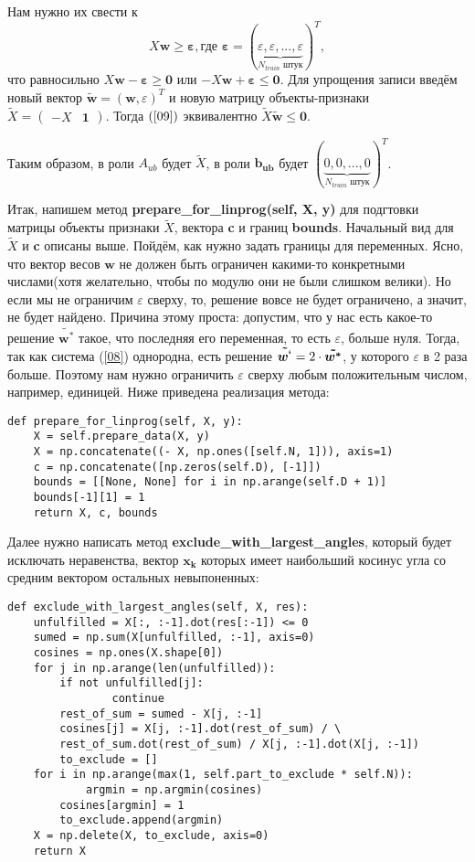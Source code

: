 \documentclass[a4paper]{article}
\newcommand{\w}{\bm{w}}
\newcommand{\xk}{\bm{x_k}}
\newcommand{\veps}{\bm{\varepsilon}}
\begin{document}
Нам нужно их свести к 
\begin{equation}\label{09}
X\w \ge \veps , \text{где } \veps = (\underbrace{\varepsilon, \varepsilon, ..., \varepsilon}_\text{$N_{train}$ штук})^T,
\end{equation}
что равносильно $X\w - \veps \ge \bm{0}$ или $-X\w + \veps \le \bm{0}$. Для упрощения записи введём новый вектор $\tilde{\w} = (\w, \varepsilon)^T$ и новую матрицу объекты-признаки
$\tilde{X} = \left(\begin{array}{c|c}
- X &  \bm{1}
\end{array}\right)$. Тогда $(\ref{09})$ эквивалентно $\tilde{X}\tilde{\w} \le \bm{0}$.

Таким образом, в роли $A_{ub}$ будет $\tilde{X}$, в роли $\bm{b_{ub}}$ будет $(\underbrace{0, 0, ..., 0}_\text{$N_{train}$ штук})^T$.

Итак, напишем метод \textbf{prepare\_for\_linprog(self, X, y)} для подгтовки матрицы объекты признаки $\tilde{X}$, вектора \textbf{c} и границ \textbf{bounds}. Начальный вид для $\tilde{X}$ и \textbf{c} описаны выше. Пойдём, как нужно задать границы для переменных. Ясно, что вектор весов $\w$ не должен быть ограничен какими-то конкретными числами(хотя желательно, чтобы по модулю они не были слишком велики). Но если мы не ограничим $\varepsilon$ сверху, то, решение вовсе не будет ограничено, а значит, не будет найдено. Причина этому проста: допустим, что у нас есть какое-то решение $\bm{\tilde{w^*}}$ такое, что последняя его переменная, то есть $\varepsilon$, больше нуля. Тогда, так как система (\ref{08}) однородна, есть решение $\bm{\tilde{w^`}} = 2 \cdot \bm{\tilde{w^*}}$, у которого $\varepsilon$ в 2 раза больше. Поэтому нам нужно ограничить $\varepsilon$ сверху любым положительным числом, например, единицей. Ниже приведена реализация метода:
\begin{lstlisting}
def prepare_for_linprog(self, X, y):
	X = self.prepare_data(X, y)
	X = np.concatenate((- X, np.ones([self.N, 1])), axis=1)
	c = np.concatenate([np.zeros(self.D), [-1]])
	bounds = [[None, None] for i in np.arange(self.D + 1)]
	bounds[-1][1] = 1
	return X, c, bounds
\end{lstlisting}

Далее нужно написать метод \textbf{exclude\_with\_largest\_angles}, который будет исключать неравенства, вектор $\xk$ которых имеет наибольший косинус угла со средним вектором остальных невыпоненных:
\begin{lstlisting}
def exclude_with_largest_angles(self, X, res):
	unfulfilled = X[:, :-1].dot(res[:-1]) <= 0
	sumed = np.sum(X[unfulfilled, :-1], axis=0)
	cosines = np.ones(X.shape[0])
	for j in np.arange(len(unfulfilled)):
		if not unfulfilled[j]:
    			continue
		rest_of_sum = sumed - X[j, :-1]
		cosines[j] = X[j, :-1].dot(rest_of_sum) / \
		rest_of_sum.dot(rest_of_sum) / X[j, :-1].dot(X[j, :-1])
		to_exclude = []
	for i in np.arange(max(1, self.part_to_exclude * self.N)):
    		argmin = np.argmin(cosines)
		cosines[argmin] = 1
		to_exclude.append(argmin)
	X = np.delete(X, to_exclude, axis=0)
	return X
\end{lstlisting}
\end{document}
